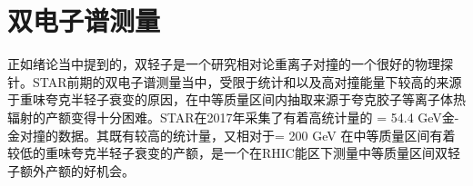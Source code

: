 
\setcounter{section}{0}

\setcounter{figure}{0}
\setcounter{table}{0}
\setcounter{equation}{0}



\chapter{双电子谱测量}

正如绪论当中提到的，双轻子是一个研究相对论重离子对撞的一个很好的物理探针。STAR前期的双电子谱测量当中，受限于统计和以及高对撞能量下较高的来源于重味夸克半轻子衰变的原因，在中等质量区间内抽取来源于夸克胶子等离子体热辐射的产额变得十分困难。STAR在2017年采集了有着高统计量的 \sNN = 54.4 GeV金-金对撞的数据。其既有较高的统计量，又相对于\sNN = 200 GeV 在中等质量区间有着较低的重味夸克半轻子衰变的产额，是一个在RHIC能区下测量中等质量区间双轻子额外产额的好机会。






% 

